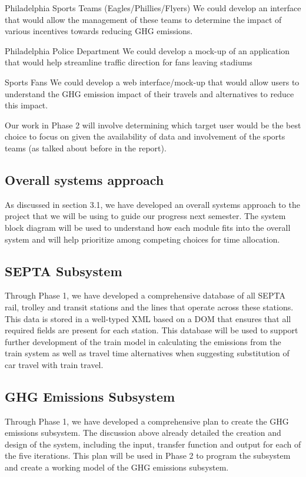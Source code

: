 \documentclass[12pt]{article}
\begin{document}
\begin{descenum}
    \item[Philadelphia Sports Teams] (Eagles/Phillies/Flyers) We could
develop an interface that would allow the management of these teams to
determine the impact of various incentives towards reducing GHG
emissions.

  \item[Philadelphia Police Department] We could develop a mock-up of
an application that would help streamline traffic direction for fans
leaving stadiums

  \item[Sports Fans] We could develop a web interface/mock-up that would
allow users to understand the GHG emission impact of their travels and
alternatives to reduce this impact.
\end{descenum}

Our work in Phase 2 will involve determining which target user would
be the best choice to focus on given the availability of data and
involvement of the sports teams (as talked about before in the
report).

\subsection{Overall systems approach}
As discussed in section 3.1, we
have developed an overall systems approach to the project that we will
be using to guide our progress next semester. The system block diagram
will be used to understand how each module fits into the overall
system and will help prioritize among competing choices for time
allocation.

\subsection{SEPTA Subsystem}
Through Phase 1, we have developed a comprehensive database of all
SEPTA rail, trolley and transit stations and the lines that operate
across these stations. This data is stored in a well-typed XML based
on a DOM that ensures that all required fields are present for each
station. This database will be used to support further development of
the train model in calculating the emissions from the train system as
well as travel time alternatives when suggesting substitution of car
travel with train travel.

\subsection{GHG Emissions Subsystem}
Through Phase 1, we
have developed a comprehensive plan to create the GHG emissions
subsystem. The discussion above already detailed the creation and
design of the system, including the input, transfer function and
output for each of the five iterations. This plan will be used in
Phase 2 to program the subsystem and create a working model of the GHG
emissions subsystem.
\end{document}

